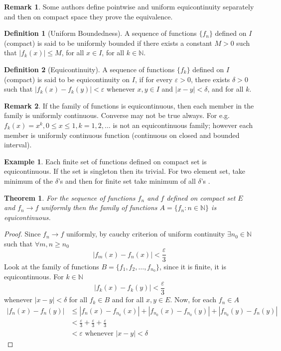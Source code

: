 \documentclass[12pt,reqno]{amsart}
\theoremstyle{plain}
\newtheorem{thm}{Theorem}
\theoremstyle{definition}
\newtheorem{defn}{Definition}
\newtheorem{eg}{Example}
\newtheorem{rem}{Remark}
\begin{document}
\begin{rem}
    Some authors define pointwise and uniform equicontinuity separately and then on compact space they prove the equivalence.
\end{rem}
\begin{defn}[Uniform Boundedness]
    A sequence of functions $\{f_n\}$ defined on $I$(compact) is said to be uniformly bounded if there exists a constant $M > 0$ such that $\left|f_k(x)\right| \leq M$, for all $ x \in I$, for all $ k \in \mathbb{N}$.
\end{defn}
\begin{defn}[Equicontinuity]
    A sequence of functions $\{f_k\}$ defined on $I$(compact) is said to be equicontinuity on $I$, if for every $\varepsilon > 0$, there exists $\delta > 0$ such that $\left|f_k(x) - f_k(y)\right| < \varepsilon $ whenever $x,y \in I$ and $|x-y| < \delta$, and for all $k$.
\end{defn}
\begin{rem}
    If the family of functions is equicontinuous, then each member in the family is uniformly continuous. Converse may not be true always. For e.g. $f_k(x) = x^k, 0 \leq x \leq 1, k =1,2,\dots$ is not an equicontinuous family; however each member is uniformly continuous function (continuous on closed and bounded interval).
\end{rem}
\begin{eg}
    Each finite set of functions defined on compact set is equicontinuous. If the set is singleton then its trivial. For two element set, take minimum of the $\delta$'s and then for finite set take minimum of all $\delta$'s .
\end{eg}
\begin{thm}
    For the sequence of functions $f_n$ and $f$ defined on compact set $E$ and $f_n \to f$ uniformly then the family of functions $A = \{f_n \colon n \in \mathbb{N}\}$ is equicontinuous.
\end{thm}
\begin{proof}
    Since $f_n \to f$ uniformly, by cauchy criterion of uniform continuity $\exists n_0 \in \mathbb{N}$ such that $\forall m,n \geq n_0$
    $$ |f_m(x) - f_n(x)| < \frac{\varepsilon}{3}$$
    Look at the family of functions $B = \{f_1, f_2, \dots, f_{n_0}\}$, since it is finite, it is equicontinuous. For $k \in \mathbb{N}$
    $$ |f_k(x) - f_k(y)| < \frac{\varepsilon}{3}$$ whenever $|x - y| < \delta$ for all $f_k \in B$ and for all $x,y \in E$.
    Now, for each $f_n \in A$ 
    \begin{align*}
        |f_n(x) - f_n(y)| &\leq |f_n(x) - f_{n_0}(x)| + |f_{n_0}(x) - f_{n_0}(y)| + |f_{n_0}(y) - f_n(y)| \\
        & < \frac{\varepsilon}{3} + \frac{\varepsilon}{3} +\frac{\varepsilon}{3}\\
        & < \varepsilon \text{ whenever } |x - y| < \delta   
    \end{align*}
\end{proof}
\end{document}
